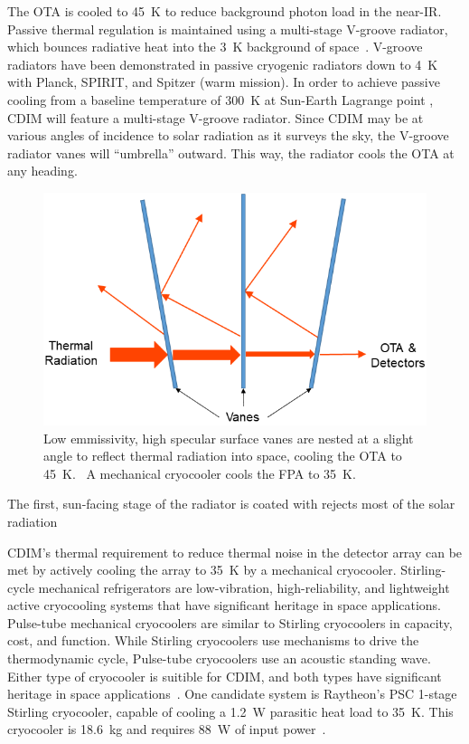 \documentclass{ws-jai}
\begin{document}
The OTA is cooled to \SI{45}{\kelvin} to reduce background photon load in the near-IR.\@
Passive thermal regulation is maintained using a multi-stage V-groove radiator, which bounces radiative heat into the \SI{3}{\kelvin} background of space~\cite{bard_1987}.
V-groove radiators have been demonstrated in passive cryogenic radiators down to \SI{4}{\kelvin} with Planck, SPIRIT, and Spitzer (warm mission).\@
In order to achieve passive cooling from a baseline temperature of \SI{300}{\kelvin} at Sun-Earth Lagrange point \Ltwo, CDIM will feature a multi-stage V-groove radiator.
Since CDIM may be at various angles of incidence to solar radiation as it surveys the sky, the V-groove radiator vanes will ``umbrella'' outward.
This way, the radiator cools the OTA at any heading.

\begin{figure}[!hb]
  \centering
  \includegraphics[width=.8\linewidth]{figs/vgroove-concept2.png}
  \caption{Low emmissivity, high specular surface vanes are nested at a slight angle to reflect thermal radiation into space, cooling the OTA to \SI{45}{\kelvin}.~\cite{rasbach1988} A mechanical cryocooler cools the FPA to \SI{35}{\kelvin}.
\label{fig:v-groove}
}
\end{figure}

The first, sun-facing stage of the radiator is coated  with rejects most of the solar radiation


CDIM's thermal requirement to reduce thermal noise in the detector array can be met by actively cooling the array to \SI{35}{\kelvin} by a mechanical cryocooler.
Stirling-cycle mechanical refrigerators are low-vibration, high-reliability, and lightweight active cryocooling systems that have significant heritage in space applications.
Pulse-tube mechanical cryocoolers are similar to Stirling cryocoolers in capacity, cost, and function.
While Stirling cryocoolers use mechanisms to drive the thermodynamic cycle, Pulse-tube cryocoolers use an acoustic standing wave.
Either type of cryocooler is suitible for CDIM, and both types have significant heritage in space applications~\cite{gilmore2003spacecraft}.
One candidate system is Raytheon's PSC 1-stage Stirling cryocooler, capable of cooling a \SI{1.2}{\watt} parasitic heat load to \SI{35}{\kelvin}.
This cryocooler is \SI{18.6}{\kilo\gram} and requires \SI{88}{\watt} of input power~\cite{ross2005cryocoolers}.
\end{document}
